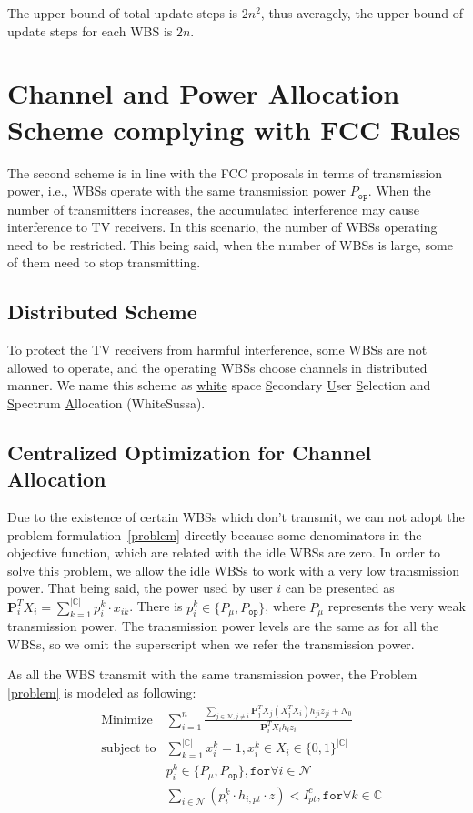 \documentclass[times]{ettauth}
\newcommand{\ie}{i.e., }
\theoremstyle{mytheoremstyle}
\theoremstyle{mytheoremstyle}
\theoremstyle{mytheoremstyle}
\renewcommand{\vec}[1]{\mathbf{#1}}
\begin{document}
The upper bound of total update steps is $2n^2$, thus averagely, the upper bound of update steps for each WBS is $2n$.

\section{Channel and Power Allocation Scheme complying with FCC Rules}
\label{schemeII}
The second scheme is in line with the FCC proposals in terms of transmission power, \ie WBSs operate with the same transmission power $P_{\mathtt{op}}$.
When the number of transmitters increases, the accumulated interference may cause interference to TV receivers.
In this scenario, the number of WBSs operating need to be restricted.
This being said, when the number of WBSs is large, some of them need to stop transmitting.
\subsection{Distributed Scheme}
To protect the TV receivers from harmful interference, some WBSs are not allowed to operate, and the operating WBSs choose channels in distributed manner.
We name this scheme as \underline{white} space \underline{S}econdary \underline{U}ser \underline{S}election and \underline{S}pectrum \underline{A}llocation (WhiteSussa). 

\subsection{Centralized Optimization for Channel Allocation}
Due to the existence of certain WBSs which don't transmit, we can not adopt the problem formulation~\ref{problem} directly because some denominators in the objective function, which are related with the idle WBSs are zero.
In order to solve this problem, we allow the idle WBSs to work with a very low transmission power.
That being said, the power used by user $i$ can be presented as $\vec{P}_i^T X_i = \sum\limits_{k=1}^{|\mathbb{C}|}p_i^k\cdot x_{ik}$.
There is $p_i^k\in \{P_\mu, P_{\mathtt{op}}\}$, where $P_\mu$ represents the very weak transmission power.
The transmission power levels are the same as for all the WBSs, so we omit the superscript when we refer the transmission power.

As all the WBS transmit with the same transmission power, the Problem \ref{problem} is modeled as following:
	\begin{equation}
\label{QLP}
		\begin{aligned}
		& \underset{}{\text{Minimize}}
		&  \sum\limits^{n}_{i=1} \frac{\sum\limits_{j\in\mathcal{N}, j\neq i}\vec{P}_j^TX_j(X_j^TX_i)h_{ji}z_{ji} + N_0}{\vec{P}_i^TX_ih_iz_i}\\
		& \text{subject to}
		&  \sum\limits_{k=1}^{|\mathbb{C}|}x_i^k=1, x_i^k\in X_i\in \{0,1\}^{|\mathbb{C}|}\\
		& & p_i^k\in \{P_\mu, P_{\mathtt{op}}\}, \mathtt{for} \forall i\in \mathcal{N}\\
     	& & \sum_{i\in \mathcal{N}} (p^k_i \cdot h_{i,pt}\cdot z) < I^c_{pt},  \mathtt{for} \forall k\in \mathbb{C} 
		\end{aligned}
	\end{equation}
	
\end{document}
